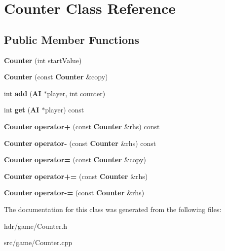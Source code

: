 \section{Counter Class Reference}
\label{class_counter}
\subsection*{Public Member Functions}
\begin{DoxyCompactItemize}
\item 
{\bfseries Counter} (int start\-Value)\label{class_counter_a752e5a706abe75d87ff2fcb5ce41a313}

\item 
{\bfseries Counter} (const {\bf Counter} \&copy)\label{class_counter_ae36386566b1cc1bfbce065dd182e1e1e}

\item 
int {\bfseries add} ({\bf A\-I} $\ast$player, int counter)\label{class_counter_a7f4afd6b55161dee82b1e046af77924b}

\item 
int {\bfseries get} ({\bf A\-I} $\ast$player) const \label{class_counter_a95c8f10bc296a35599cb97f3dc33f0e9}

\item 
{\bf Counter} {\bfseries operator+} (const {\bf Counter} \&rhs) const \label{class_counter_af13b8092fbef704e68fdefb2d024683a}

\item 
{\bf Counter} {\bfseries operator-\/} (const {\bf Counter} \&rhs) const \label{class_counter_a563604893f4bc66449ac9901928ebbc4}

\item 
{\bf Counter} {\bfseries operator=} (const {\bf Counter} \&copy)\label{class_counter_a683fff5c5b2fb7082f637a817106ec4f}

\item 
{\bf Counter} {\bfseries operator+=} (const {\bf Counter} \&rhs)\label{class_counter_a0923b8779d18168542db7281bdb7c6c2}

\item 
{\bf Counter} {\bfseries operator-\/=} (const {\bf Counter} \&rhs)\label{class_counter_a99857e9ec0584d6525fc49e00223b555}

\end{DoxyCompactItemize}


The documentation for this class was generated from the following files\-:\begin{DoxyCompactItemize}
\item 
hdr/game/Counter.\-h\item 
src/game/Counter.\-cpp\end{DoxyCompactItemize}

